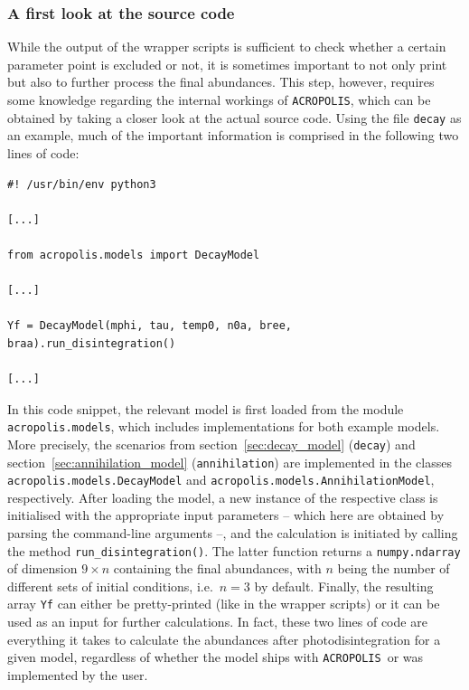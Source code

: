 \documentclass[11pt,a4paper]{article}
\newcommand{\acropolis}{\texttt{ACROPOLIS}~}
\begin{document}
\subsubsection{A first look at the source code}
While the output of the wrapper scripts is sufficient to check whether a certain parameter point is excluded or not, it is sometimes important to not only print but also to further process the final abundances. This step, however, requires some knowledge regarding the internal workings of \texttt{ACROPOLIS}, which can be obtained by taking a closer look at the actual source code. Using the file \texttt{decay} as an example, much of the important information is comprised in the following two lines of code:
\begin{lstlisting}
#! /usr/bin/env python3

[...]

from acropolis.models import DecayModel

[...]

Yf = DecayModel(mphi, tau, temp0, n0a, bree, braa).run_disintegration()

[...]
\end{lstlisting}
In this code snippet, the relevant model is first loaded from the module \texttt{acropolis.models}, which includes implementations for both example models. More precisely, the scenarios from section~\ref{sec:decay_model} (\texttt{decay}) and section~\ref{sec:annihilation_model} (\texttt{annihilation}) are implemented in the classes \texttt{acropolis.models.DecayModel} and \texttt{acropolis.models.AnnihilationModel}, respectively. After loading the model, a new instance of the respective class is initialised with the appropriate input parameters -- which here are obtained by parsing the command-line arguments --, and the calculation is initiated by calling the method \texttt{run\_disintegration()}. The latter function returns a \texttt{numpy.ndarray} of dimension $9\times n$ containing the final abundances, with $n$ being the number of different sets of initial conditions, i.e.\ $n=3$ by default. Finally, the resulting array \texttt{Yf} can either be pretty-printed (like in the wrapper scripts) or it can be used as an input for further calculations. In fact, these two lines of code are everything it takes to calculate the abundances after photodisintegration for a given model, regardless of whether the model ships with \acropolis or was implemented by the user.
\end{document}

